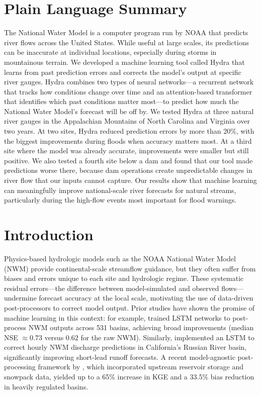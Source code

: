 \documentclass[draft]{agujournal2019}
\begin{document}
\section*{Plain Language Summary}
The National Water Model is a computer program run by NOAA that predicts river flows across the United States. While useful at large scales, its predictions can be inaccurate at individual locations, especially during storms in mountainous terrain. We developed a machine learning tool called Hydra that learns from past prediction errors and corrects the model's output at specific river gauges. Hydra combines two types of neural networks---a recurrent network that tracks how conditions change over time and an attention-based transformer that identifies which past conditions matter most---to predict how much the National Water Model's forecast will be off by. We tested Hydra at three natural river gauges in the Appalachian Mountains of North Carolina and Virginia over two years. At two sites, Hydra reduced prediction errors by more than 20\%, with the biggest improvements during floods when accuracy matters most. At a third site where the model was already accurate, improvements were smaller but still positive. We also tested a fourth site below a dam and found that our tool made predictions worse there, because dam operations create unpredictable changes in river flow that our inputs cannot capture. Our results show that machine learning can meaningfully improve national-scale river forecasts for natural streams, particularly during the high-flow events most important for flood warnings.


\section{Introduction}

Physics-based hydrologic models such as the NOAA National Water Model (NWM) provide continental-scale streamflow guidance, but they often suffer from biases and errors unique to each site and hydrologic regime. These systematic residual errors---the difference between model-simulated and observed flows---undermine forecast accuracy at the local scale, motivating the use of data-driven post-processors to correct model output. Prior studies have shown the promise of machine learning in this context: for example,  trained LSTM networks to post-process NWM outputs across 531 basins, achieving broad improvements (median NSE $\approx 0.73$ versus $0.62$ for the raw NWM). Similarly,  implemented an LSTM to correct hourly NWM discharge predictions in California's Russian River basin, significantly improving short-lead runoff forecasts. A recent model-agnostic post-processing framework by , which incorporated upstream reservoir storage and snowpack data, yielded up to a 65\% increase in KGE and a 33.5\% bias reduction in heavily regulated basins.
\end{document}

